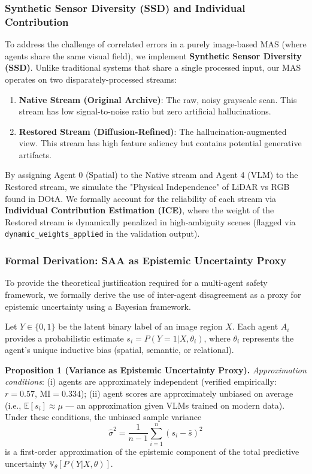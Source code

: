 \documentclass[12pt,onecolumn,a4paper]{IEEEtran}
\begin{document}
\subsubsection{Synthetic Sensor Diversity (SSD) and Individual Contribution}
To address the challenge of correlated errors in a purely image-based MAS (where agents share the same visual field), we implement \textbf{Synthetic Sensor Diversity (SSD)}. Unlike traditional systems that share a single processed input, our MAS operates on two disparately-processed streams:
\begin{enumerate}
    \item \textbf{Native Stream (Original Archive)}: The raw, noisy grayscale scan. This stream has low signal-to-noise ratio but zero artificial hallucinations.
    \item \textbf{Restored Stream (Diffusion-Refined)}: The hallucination-augmented view. This stream has high feature saliency but contains potential generative artifacts.
\end{enumerate}
By assigning Agent 0 (Spatial) to the Native stream and Agent 4 (VLM) to the Restored stream, we simulate the "Physical Independence" of LiDAR vs RGB found in DOtA. We formally account for the reliability of each stream via \textbf{Individual Contribution Estimation (ICE)}, where the weight of the Restored stream is dynamically penalized in high-ambiguity scenes (flagged via \texttt{dynamic\_weights\_applied} in the validation output).

\subsubsection{Formal Derivation: SAA as Epistemic Uncertainty Proxy}
To provide the theoretical justification required for a multi-agent safety framework, we formally derive the use of inter-agent disagreement as a proxy for epistemic uncertainty using a Bayesian framework.

Let $Y \in \{0, 1\}$ be the latent binary label of an image region $X$. Each agent $A_i$ provides a probabilistic estimate $s_i = P(Y=1 | X, \theta_i)$, where $\theta_i$ represents the agent's unique inductive bias (spatial, semantic, or relational).

\textbf{Proposition 1 (Variance as Epistemic Uncertainty Proxy).}\quad
\textit{Approximation conditions}: (i) agents are approximately independent (verified empirically: $r=0.57$, $\mathrm{MI}=0.334$); (ii) agent scores are approximately unbiased on average (i.e., $\mathbb{E}[s_i] \approx \mu$ — an approximation given VLMs trained on modern data). Under these conditions, the unbiased sample variance
\begin{equation}
  \hat{\sigma}^2 = \frac{1}{n-1}\sum_{i=1}^{n}(s_i - \bar{s})^2
\end{equation}
is a first-order approximation of the epistemic component of the total predictive uncertainty $\mathbb{V}_{\theta}[P(Y|X,\theta)]$.
\end{document}
